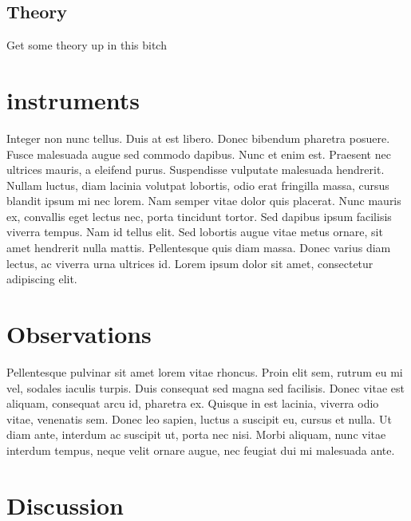 \documentclass[norsk,a4paper,12pt]{article}
\begin{document}
\subsection{Theory} %
\label{sub:theory}
Get some theory up in this bitch



\section{instruments} %
\label{sec:instruments}


Integer non nunc tellus. Duis at est libero. Donec bibendum pharetra posuere. Fusce malesuada augue sed commodo dapibus. Nunc et enim est. Praesent nec ultrices mauris, a eleifend purus. Suspendisse vulputate malesuada hendrerit. Nullam luctus, diam lacinia volutpat lobortis, odio erat fringilla massa, cursus blandit ipsum mi nec lorem. Nam semper vitae dolor quis placerat. Nunc mauris ex, convallis eget lectus nec, porta tincidunt tortor. Sed dapibus ipsum facilisis viverra tempus. Nam id tellus elit. Sed lobortis augue vitae metus ornare, sit amet hendrerit nulla mattis. Pellentesque quis diam massa. Donec varius diam lectus, ac viverra urna ultrices id. Lorem ipsum dolor sit amet, consectetur adipiscing elit.


\section{Observations} %
\label{sec:observations}


Pellentesque pulvinar sit amet lorem vitae rhoncus. Proin elit sem, rutrum eu mi vel, sodales iaculis turpis. Duis consequat sed magna sed facilisis. Donec vitae est aliquam, consequat arcu id, pharetra ex. Quisque in est lacinia, viverra odio vitae, venenatis sem. Donec leo sapien, luctus a suscipit eu, cursus et nulla. Ut diam ante, interdum ac suscipit ut, porta nec nisi. Morbi aliquam, nunc vitae interdum tempus, neque velit ornare augue, nec feugiat dui mi malesuada ante. 


\section{Discussion} %
\label{sec:discussion}
\end{document}
